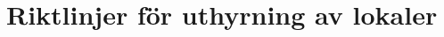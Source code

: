\documentclass[10pt]{article}
\def\doctitle{Riktlinjer för uthyrning av lokaler}
\begin{document}
    \section*{\doctitle}
\end{document}
